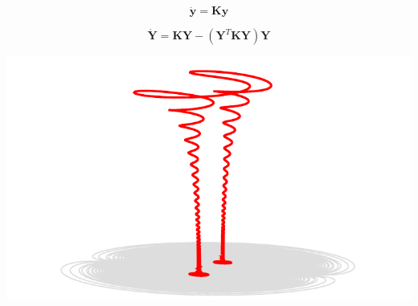 \begin{equation*}
  \dot{\mathbf{y}} = \mathbf{K} \mathbf{y}
\end{equation*}

\begin{equation*}
  \dot{\mathbf{Y}} = \mathbf{K} \mathbf{Y} - (\mathbf{Y}^T \mathbf{K} \mathbf{Y}) \mathbf{Y}
\end{equation*}

\eframe

\begin{center}
  \includegraphics[width=\textwidth]{i/far.pdf}
\end{center}
\eframe

